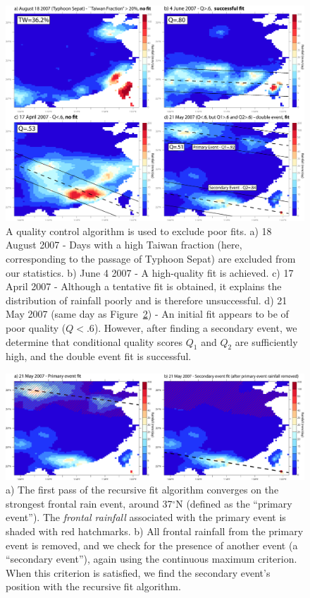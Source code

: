\documentclass[singlecolumn,11pt]{pnas-new}
\begin{document}
\clearpage

\begin{figure}[htbp]
\centering
\noindent\includegraphics[width=39pc]{Figures/algo_3}
\caption{A quality control algorithm is used to exclude poor fits. a) 18 August 2007 - Days with a high Taiwan fraction (here, corresponding to the passage of Typhoon Sepat) are excluded from our statistics. b) June 4 2007 - A high-quality fit is achieved. c) 17 April 2007 - Although a tentative fit is obtained, it explains the distribution of rainfall poorly and is therefore unsuccessful. d) 21 May 2007 (same day as Figure~\ref{fig:algo_4}) - An initial fit appears to be of poor quality ($Q<.6$). However, after finding a secondary event, we determine that conditional quality scores $Q_1$ and $Q_2$ are sufficiently high, and the double event fit is successful.}
\label{fig:algo_3}
\end{figure}

\begin{figure}[htbp]
\centering
\noindent\includegraphics[width=39pc]{Figures/algo_4}
\caption{a) The first pass of the recursive fit algorithm converges on the strongest frontal rain event, around 37$^{\circ}$N (defined as the ``primary event''). The \textit{frontal rainfall} associated with the primary event is shaded with red hatchmarks. b) All frontal rainfall from the primary event is removed, and we check for the presence of another event (a ``secondary event''), again using the continuous maximum criterion. When this criterion is satisfied, we find the secondary event's position with the recursive fit algorithm.}
\label{fig:algo_4}
\end{figure}
\end{document}
